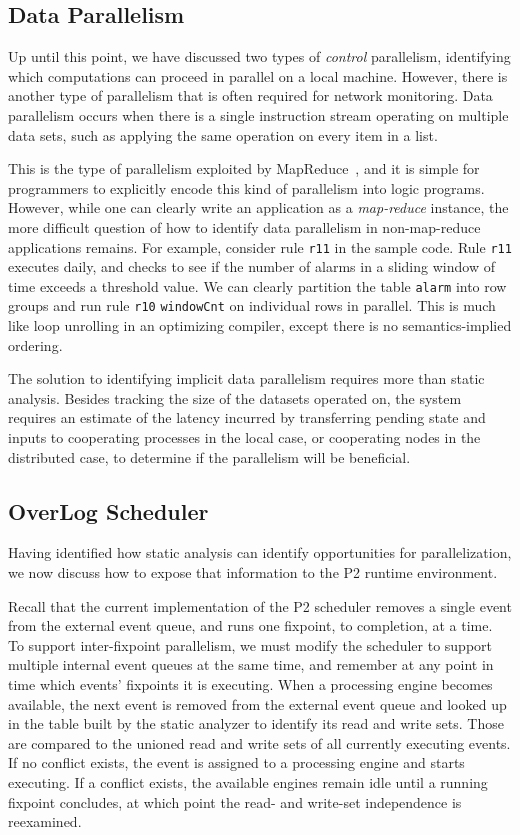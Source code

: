 \documentclass[10pt,twocolumn]{MyTightStyle}
\newcommand{\ol}[1]{{\tt\footnotesize#1}}
\begin{document}
\subsection{Data Parallelism}

Up until this point, we have discussed two types of {\em control} parallelism, identifying which computations can proceed in parallel on a local machine. However, there is another type of parallelism that is often required for network monitoring. Data parallelism occurs when there is a single instruction stream
operating on multiple data sets, such as applying the same operation on every item in a list. 

This is the type of parallelism exploited by MapReduce~\cite{dean04},
and it is simple for programmers to explicitly encode this kind of
parallelism into logic programs. However, while one can clearly write an
application as a {\em map-reduce} instance, the more difficult question
of how to identify data parallelism in non-map-reduce applications
remains. For example, consider rule \ol{r11} in the sample code.  Rule
\ol{r11} executes daily, and checks to see if the number of alarms in a
sliding window of time exceeds a threshold value. We can clearly
partition the table \ol{alarm} into row groups and run rule \ol{r10}
\ol{windowCnt} on individual rows in parallel. This is much like loop
unrolling in an optimizing compiler, except there is no semantics-implied ordering.

The solution to identifying implicit data parallelism requires more than
static analysis. Besides tracking the size of the datasets operated on,
the system requires an estimate of the latency incurred by transferring
pending state and inputs to cooperating processes in the local case, or
cooperating nodes in the distributed case, to determine if the
parallelism will be beneficial.


\subsection{OverLog Scheduler}

Having identified how static analysis can identify opportunities for parallelization, we now discuss how to expose that information to the P2 runtime environment.

Recall that the current implementation of the P2 scheduler removes a
single event from the external event queue, and runs one fixpoint, to
completion, at a time. To support inter-fixpoint parallelism, we must
modify the scheduler to support multiple internal event queues at the
same time, and remember at any point in time which events' fixpoints it
is executing. When a processing engine becomes available, the next event
is removed from the external event queue and looked up in the table
built by the static analyzer to identify its read and write sets. Those
are compared to the unioned read and write sets of all currently
executing events. If no conflict exists, the event is assigned to a
processing engine and starts executing. If a conflict exists, the
available engines remain idle until a running fixpoint concludes, at
which point the read- and write-set independence is reexamined.
\end{document}
